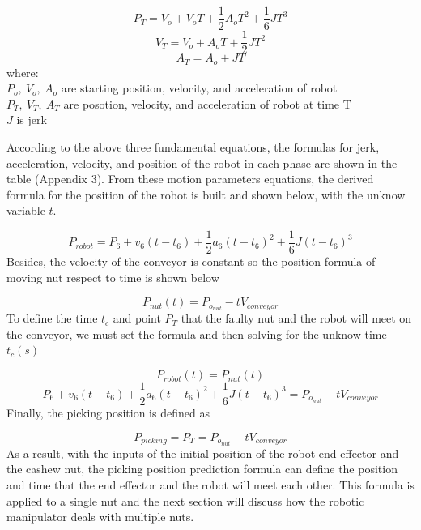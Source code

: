 \documentclass[10pt, letterpaper]{article}
\begin{document}
    \begin{equation} \label{eq17} P_T = V_o + V_o{T} + \frac{1}{2} A_o{T^2} + \frac{1}{6} JT^3 \end{equation}
    \begin{equation} \label{eq18} V_T = V_o + A_o{T} + \frac{1}{2} JT^2 \end{equation}
    \begin{equation} \label{eq19} A_T = A_o + JT \end{equation}
    where:\\
    $P_o,\:V_o,\:A_o$ are starting position, velocity, and acceleration of robot\\
    $P_T,\:V_T,\:A_T$ are posotion, velocity, and acceleration of robot at time T\\
    $J$ is jerk
    \par
    According to the above three fundamental equations, the formulas for jerk, acceleration, velocity, and position of the robot in each phase are shown in the table (Appendix 3). From these motion parameters equations, the derived formula for the position of the robot is built and shown below, with the unknow variable $t$. \par
    \begin{equation} \label{eq20} P_{robot} = P_6 + v_6(t-t_6) + \frac{1}{2} a_6(t-t_6)^2 + \frac{1}{6} J(t-t_6)^3 \end{equation}
    Besides, the velocity of the conveyor is constant so the position formula of moving nut respect to time is shown below\par
    \begin{equation} \label{eq21} P_{nut}(t) = P_{{o}_{nut}} - tV_{conveyor} \end{equation}
    To define the time \(t_c\) and point \(P_T\) that the faulty nut and the robot will meet on the conveyor, we must set the formula and then solving for the unknow time \(t_c (s)\)\par
    \begin{equation} \label{eq22} P_{robot}(t) = P_{nut}(t) \end{equation}
    \begin{equation} \label{eq23} P_6 + v_6(t-t_6) + \frac{1}{2} a_6(t-t_6)^2 + \frac{1}{6} J(t-t_6)^3 = P_{{o}_{nut}} - tV_{conveyor} \end{equation}
    Finally, the picking position is defined as\par
    \begin{equation} \label{eq24} P_{picking} = P_T = P_{{o}_{nut}} - tV_{conveyor} \end{equation}
    As a result, with the inputs of the initial position of the robot end effector and the cashew nut, the picking position prediction formula can define the position and time that the end effector and the robot will meet each other. This formula is applied to a single nut and the next section will discuss how the robotic manipulator deals with multiple nuts.\par
\end{document}
